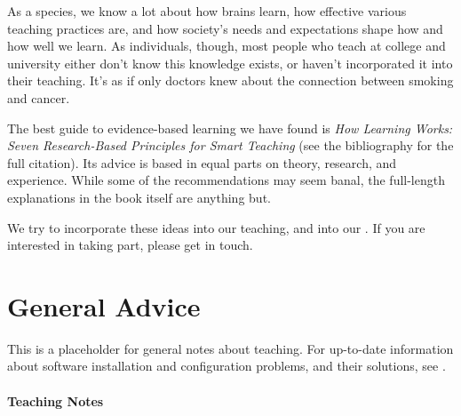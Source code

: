 \documentclass{book}
\begin{document}
As a species, we know a lot about how brains learn, how effective
various teaching practices are, and how society's needs and expectations
shape how and how well we learn. As individuals, though, most people who
teach at college and university either don't know this knowledge exists,
or haven't incorporated it into their teaching. It's as if only doctors
knew about the connection between smoking and cancer.

The best guide to evidence-based learning we have found is \emph{How
Learning Works: Seven Research-Based Principles for Smart Teaching} (see
the bibliography for the full citation). Its advice is based in equal
parts on theory, research, and experience. While some of the
recommendations may seem banal, the full-length explanations in the book
itself are anything but.

We try to incorporate these ideas into our teaching, and into our
. If you are interested in taking part, please get in touch.

\section{General Advice}

This is a placeholder for general notes about teaching. For up-to-date
information about software installation and configuration problems, and
their solutions, see
.

\mbox{}\paragraph{Teaching Notes}
\end{document}
